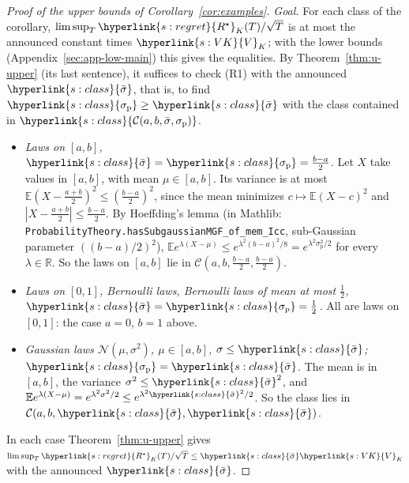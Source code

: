 \documentclass[11pt]{article}
\DeclareRobustCommand{\sy}[2]{{\hyperlink{#1}{#2}}}
\newcommand{\R}{\mathbb{R}}
\newcommand{\E}{\mathbb{E}}
\newcommand{\1}{\mathbf{1}}
\newcommand{\Rs}{\sy{s:regret}{R^\star}}
\newcommand{\Cab}{\sy{s:class}{\mathcal C(a,b,\bar\sigma,\sigma_{\mathrm p})}}
\newcommand{\sbar}{\sy{s:class}{\bar\sigma}}
\newcommand{\sigp}{\sy{s:class}{\sigma_{\mathrm p}}}
\newcommand{\VK}{\sy{s:VK}{V}}
\begin{document}
\begin{proof}[Proof of the upper bounds of Corollary~\ref{cor:examples}]
\textit{Goal.} For each class of the corollary, $\limsup_T\Rs_K(T)/\sqrt T$ is at most the announced constant times $\VK_K$; with the lower bounds
(Appendix~\ref{sec:app-low-main}) this gives the equalities. By Theorem~\ref{thm:u-upper} (its last sentence), it suffices to check (R1) with the announced $\sbar$,
that is, to find $\sigp\ge\sbar$ with the class contained in $\Cab$.
\begin{itemize}
\item \emph{Laws on $[a,b]$, $\sbar=\sigp=\frac{b-a}2$.} Let $X$ take values in $[a,b]$, with mean $\mu\in[a,b]$. Its variance is at most
$\E(X-\frac{a+b}2)^2\le(\frac{b-a}2)^2$, since the mean minimizes $c\mapsto\E(X-c)^2$ and $|X-\frac{a+b}2|\le\frac{b-a}2$. By Hoeffding's lemma (in Mathlib: \texttt{ProbabilityTheory.hasSubgaussianMGF\_of\_mem\_Icc}, sub-Gaussian parameter $((b-a)/2)^2$),
$\E e^{\lambda(X-\mu)}\le e^{\lambda^2(b-a)^2/8}=e^{\lambda^2\sigma_{\mathrm p}^2/2}$ for every $\lambda\in\R$. So the laws on $[a,b]$ lie in
$\mathcal C(a,b,\frac{b-a}2,\frac{b-a}2)$.
\item \emph{Laws on $[0,1]$, Bernoulli laws, Bernoulli laws of mean at most $\frac12$, $\sbar=\sigp=\frac12$.} All are laws on $[0,1]$: the case $a=0$, $b=1$
above.
\item \emph{Gaussian laws $\mathcal N(\mu,\sigma^2)$, $\mu\in[a,b]$, $\sigma\le\sbar$; $\sigp=\sbar$.} The mean is in $[a,b]$, the variance $\sigma^2\le\sbar^2$, and
$\E e^{\lambda(X-\mu)}=e^{\lambda^2\sigma^2/2}\le e^{\lambda^2\sbar^2/2}$. So the class lies in $\mathcal C(a,b,\sbar,\sbar)$.
\end{itemize}
In each case Theorem~\ref{thm:u-upper} gives $\limsup_T\Rs_K(T)/\sqrt T\le\sbar\VK_K$ with the announced $\sbar$.
\end{proof}
\end{document}
